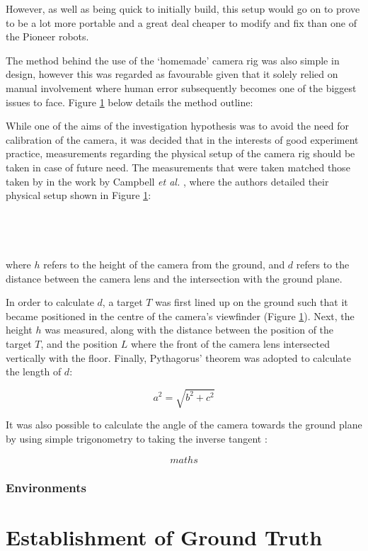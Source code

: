 However, as well as being quick to initially build, this setup would go on to prove to be a lot more portable and a great deal cheaper to modify and fix than one of the Pioneer robots. 

The method behind the use of the `homemade' camera rig was also simple in design, however this was regarded as favourable given that it solely relied on manual involvement where human error subsequently becomes one of the biggest issues to face. Figure \ref{} below details the method outline: 


While one of the aims of the investigation hypothesis was to avoid the need for calibration of the camera, it was decided that in the interests of good experiment practice, measurements regarding the physical setup of the camera rig should be taken in case of future need. The measurements that were taken matched those taken by in the work by Campbell \textit{et al.}  \cite{campbell}, where the authors detailed their physical setup shown in Figure \ref{}:
\\
\\
\\
\\
\\
where $h$ refers to the height of the camera from the ground, and $d$ refers to the distance between the camera lens and the intersection with the ground plane. 

In order to calculate $d$, a target $T$ was first lined up on the ground such that it became positioned in the centre of the camera's viewfinder (Figure \ref{}). Next, the height $h$ was measured, along with the distance between the position of the target $T$, and the position $L$ where the front of the camera lens intersected vertically with the floor. Finally, Pythagorus' theorem was adopted to calculate the length of $d$:

$$ a^2 = \sqrt{b^2 + c^2} $$

It was also possible to calculate the angle of the camera towards the ground plane by using simple trigonometry to taking the inverse tangent \cite{campbell}:

$$ maths $$

\subsubsection{Environments}

\section{Establishment of Ground Truth}

